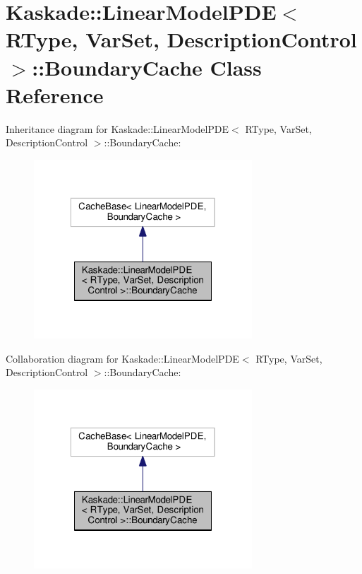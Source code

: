 \hypertarget{classKaskade_1_1LinearModelPDE_1_1BoundaryCache}{\section{Kaskade\-:\-:Linear\-Model\-P\-D\-E$<$ R\-Type, Var\-Set, Description\-Control $>$\-:\-:Boundary\-Cache Class Reference}
\label{classKaskade_1_1LinearModelPDE_1_1BoundaryCache}
}


Inheritance diagram for Kaskade\-:\-:Linear\-Model\-P\-D\-E$<$ R\-Type, Var\-Set, Description\-Control $>$\-:\-:Boundary\-Cache\-:
\nopagebreak
\begin{figure}[H]
\begin{center}
\leavevmode
\includegraphics[width=232pt]{classKaskade_1_1LinearModelPDE_1_1BoundaryCache__inherit__graph}
\end{center}
\end{figure}


Collaboration diagram for Kaskade\-:\-:Linear\-Model\-P\-D\-E$<$ R\-Type, Var\-Set, Description\-Control $>$\-:\-:Boundary\-Cache\-:
\nopagebreak
\begin{figure}[H]
\begin{center}
\leavevmode
\includegraphics[width=232pt]{classKaskade_1_1LinearModelPDE_1_1BoundaryCache__coll__graph}
\end{center}
\end{figure}
